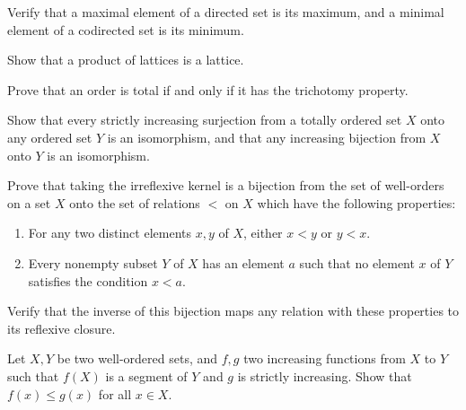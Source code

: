 \documentclass{article}
\begin{document}
\begin{exercise}
  \label{exe:swjbrepg}
  Verify that a maximal element of a directed set is its maximum, and
  a minimal element of a codirected set is its minimum.
\end{exercise}

\begin{exercise}
  \label{exe:yowl3axc}
  Show that a product of lattices is a lattice.
\end{exercise}

\begin{exercise}
  \label{exe:4knqif5b}
  Prove that an order is total if and only if it has the trichotomy
  property.
\end{exercise}

\begin{exercise}
  \label{exe:v1tw1ijd}
  Show that every strictly increasing surjection from a totally
  ordered set \(X\) onto any ordered set \(Y\) is an isomorphism, and
  that any increasing bijection from \(X\) onto \(Y\) is an
  isomorphism.
\end{exercise}

\begin{exercise}
  \label{exe:4q4vnvbc}
  Prove that taking the irreflexive kernel is a bijection from the set
  of well-orders on a set \(X\) onto the set of relations \(<\) on
  \(X\) which have the following properties:
  \begin{enumerate}
  \item For any two distinct elements \(x, y\) of \(X\), either
    \(x < y\) or \(y < x\).
  \item Every nonempty subset \(Y\) of \(X\) has an element \(a\) such
    that no element \(x\) of \(Y\) satisfies the condition \(x < a\).
  \end{enumerate}
  Verify that the inverse of this bijection maps any relation with
  these properties to its reflexive closure.
\end{exercise}

\begin{exercise}
  \label{exe:gsdhavsp}
  Let \(X, Y\) be two well-ordered sets, and \(f, g\) two increasing
  functions from \(X\) to \(Y\) such that \(f(X)\) is a segment of
  \(Y\) and \(g\) is strictly increasing.  Show that
  \(f(x) \leq g(x)\) for all \(x \in X\).
\end{exercise}
\end{document}

